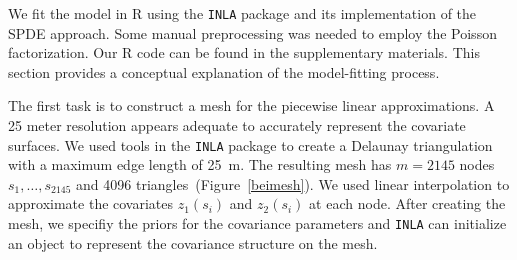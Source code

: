 \documentclass[]{interact}
\begin{document}
We fit the model in R using the \texttt{INLA} package and its implementation of
the SPDE approach. Some manual preprocessing was needed to employ the Poisson
factorization. Our R code can be found in the supplementary materials. This
section provides a conceptual explanation of the model-fitting process.

The first task is to construct a mesh for the piecewise linear approximations.
A 25 meter resolution appears adequate to accurately represent the covariate
surfaces. We used tools in the \texttt{INLA} package to create a Delaunay
triangulation with a maximum edge length of 25~m. The resulting mesh has
\(m = 2145\) nodes \(s_{1},  \dots, s_{2145}\) and 4096
triangles~(Figure~\ref{beimesh}). We used linear interpolation to approximate
the covariates \(z_{1}(s_{i})\) and \(z_{2}(s_{i})\) at each node. After
creating the mesh, we specifiy the priors for the covariance parameters and
\texttt{INLA} can initialize an object to represent the covariance structure
on the mesh.
\end{document}

